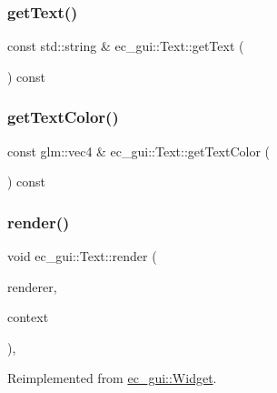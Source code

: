\subsubsection{\texorpdfstring{get\+Text()}{getText()}}
{\footnotesize\ttfamily const std\+::string \& ec\+\_\+gui\+::\+Text\+::get\+Text (\begin{DoxyParamCaption}{ }\end{DoxyParamCaption}) const}

\mbox{\label{classec__gui_1_1_text_acfa0992c94a969b45509f8ab1d23ce4e}} 
\subsubsection{\texorpdfstring{get\+Text\+Color()}{getTextColor()}}
{\footnotesize\ttfamily const glm\+::vec4 \& ec\+\_\+gui\+::\+Text\+::get\+Text\+Color (\begin{DoxyParamCaption}{ }\end{DoxyParamCaption}) const}

\mbox{\label{classec__gui_1_1_text_a08a431546765e0ff69951a4299193e7d}} 
\subsubsection{\texorpdfstring{render()}{render()}}
{\footnotesize\ttfamily void ec\+\_\+gui\+::\+Text\+::render (\begin{DoxyParamCaption}\item[{\mbox{\hyperlink{classec__gui_1_1_gui_renderer}{Gui\+Renderer}} \&}]{renderer,  }\item[{\mbox{\hyperlink{classec__gui_1_1_gui_rendering_context}{Gui\+Rendering\+Context}} \&}]{context }\end{DoxyParamCaption})\hspace{0.3cm}{\ttfamily [override]}, {\ttfamily [virtual]}}



Reimplemented from \mbox{\hyperlink{classec__gui_1_1_widget_ade9b99741eb922b24f8328509483f129}{ec\+\_\+gui\+::\+Widget}}.

\mbox{\label{classec__gui_1_1_text_a9173cc788e806e2da2f0e55d5fb9cd85}} 

